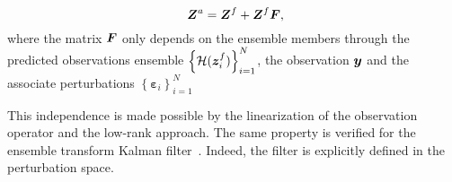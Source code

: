 \begin{equation}~\label{enkf_formula_Fcorr}
    \bm{Z}^a = \bm{Z}^f + \bm{Z}^f \bm{F},
\end{equation}where the matrix $\bm{F}$ only depends on the ensemble members through the predicted observations ensemble $\left\{\mathcal{H}(\bm{z}_i^f) \right\}^N_{i=1}$, the observation $\bm{y}$ and the associate perturbations  $\left\{\bm{\varepsilon}_i \right\}^N_{i=1}$

This independence is made possible by the linearization of the observation operator and the low-rank approach. The same property is verified for the ensemble transform Kalman filter~\cite{bishop_adaptive_2001}. Indeed, the filter is explicitly defined in the perturbation space.